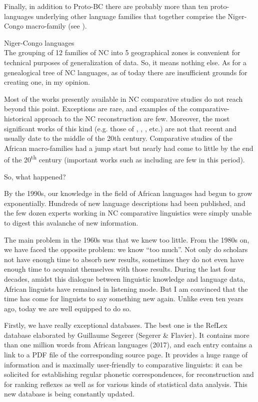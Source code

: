 Finally, in addition to Proto-BC there are probably more than ten proto-languages underlying other language families that together comprise the Niger-Congo macro-family (see ). 

 
\begin{table}
\caption{Niger-Congo languages\\
{The grouping of 12 families of NC into 5 geographical zones is convenient for technical purposes of generalization of data. So, it means nothing else. As for a genealogical tree of NC languages, as of today there are insufficient grounds for creating one, in my opinion.}
}
\label{tab:0.3}
\kppyramid
\end{table}



Most of the works presently available in NC comparative studies do not reach beyond this point. Exceptions are rare, and examples of the comparative-historical approach to the NC reconstruction are few. Moreover, the most significant works of this kind (e.g. those of \citealt{Westermann1927}, \citealt{Greenberg1966}, \citealt{Sebeok1971}, etc.) are not that recent and usually date to the middle of the 20th century. Comparative studies of the African macro-families had a jump start but nearly had come to little by the end of the 20\textsuperscript{th} century (important works such as  \citealt{Bendor-Samuel1989} including \citealt{Williamson1988,Williamson1989a} are few in this period).

So, what happened? 

By the 1990s, our knowledge in the field of African languages had begun to grow exponentially. Hundreds of new language descriptions had been published, and the few dozen experts working in NC comparative linguistics were simply unable to digest this avalanche of new information. 

The main problem in the 1960s was that we knew too little. From the 1980s on, we have faced the opposite problem: we know “too much”. Not only do scholars not have enough time to absorb new results, sometimes they do not even have enough time to acquaint themselves with those results. During the last four decades, amidst this dialogue between linguistic knowledge and language data, African linguists have remained in listening mode. But I am convinced that the time has come for linguists to say something new again. Unlike even ten years ago, today we are well equipped to do so.

Firstly, we have really exceptional databases. The best one is the RefLex database elaborated by Guillaume Segerer (Segerer \& Flavier). It contains more than one million words from African languages (2017), and each entry contains a link to a PDF file of the corresponding source page. It provides a huge range of information and is maximally user-friendly to comparative linguists: it can be solicited for establishing regular phonetic correspondences, for reconstruction and for ranking reflexes as well as for various kinds of statistical data analysis. This new database is being constantly updated. 

